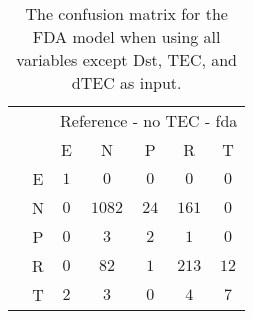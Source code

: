 \begin{table}[!ht]
	\centering
	\begin{tabular}{|c|c|c|c|c|c|c|}
		\cline{3-7}
		\multicolumn{2}{c|}{} & \multicolumn{5}{|c|}{Reference - no TEC - fda} \\ \cline{3-7}
		\multicolumn{2}{c|}{} & E & N & P & R & T \\ \hline
		\multirow{5}{*}{\rotatebox{90}{Prediction}} & E & $1$ & $0$ & $0$ & $0$ & $0$ \\ \cline{2-7}
		 & N & $0$ & $1082$ & $24$ & $161$ & $0$ \\ \cline{2-7}
		 & P & $0$ & $3$ & $2$ & $1$ & $0$ \\ \cline{2-7}
		 & R & $0$ & $82$ & $1$ & $213$ & $12$ \\ \cline{2-7}
		 & T & $2$ & $3$ & $0$ & $4$ & $7$ \\ \hline
	\end{tabular}
	\caption{The confusion matrix for the FDA model when using all variables except Dst, TEC, and dTEC as input.}
	\label{tab:cm:noTEC:fda}
\end{table}
